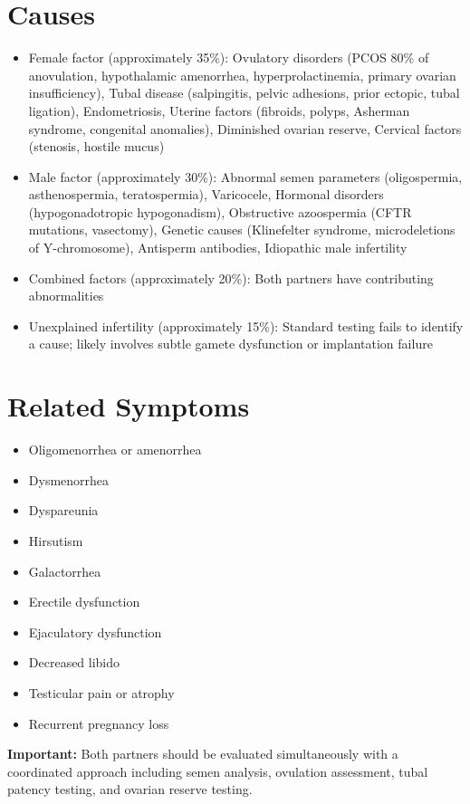 \section*{Causes}
\begin{itemize}
  \item Female factor (approximately 35\%): Ovulatory disorders (PCOS 80\% of anovulation, hypothalamic amenorrhea, hyperprolactinemia, primary ovarian insufficiency), Tubal disease (salpingitis, pelvic adhesions, prior ectopic, tubal ligation), Endometriosis, Uterine factors (fibroids, polyps, Asherman syndrome, congenital anomalies), Diminished ovarian reserve, Cervical factors (stenosis, hostile mucus)
  \item Male factor (approximately 30\%): Abnormal semen parameters (oligospermia, asthenospermia, teratospermia), Varicocele, Hormonal disorders (hypogonadotropic hypogonadism), Obstructive azoospermia (CFTR mutations, vasectomy), Genetic causes (Klinefelter syndrome, microdeletions of Y-chromosome), Antisperm antibodies, Idiopathic male infertility
  \item Combined factors (approximately 20\%): Both partners have contributing abnormalities
  \item Unexplained infertility (approximately 15\%): Standard testing fails to identify a cause; likely involves subtle gamete dysfunction or implantation failure
\end{itemize}

\section*{Related Symptoms}
\begin{itemize}
  \item Oligomenorrhea or amenorrhea
  \item Dysmenorrhea
  \item Dyspareunia
  \item Hirsutism
  \item Galactorrhea
  \item Erectile dysfunction
  \item Ejaculatory dysfunction
  \item Decreased libido
  \item Testicular pain or atrophy
  \item Recurrent pregnancy loss
\end{itemize}
\textbf{Important:} Both partners should be evaluated simultaneously with a coordinated approach including semen analysis, ovulation assessment, tubal patency testing, and ovarian reserve testing.

